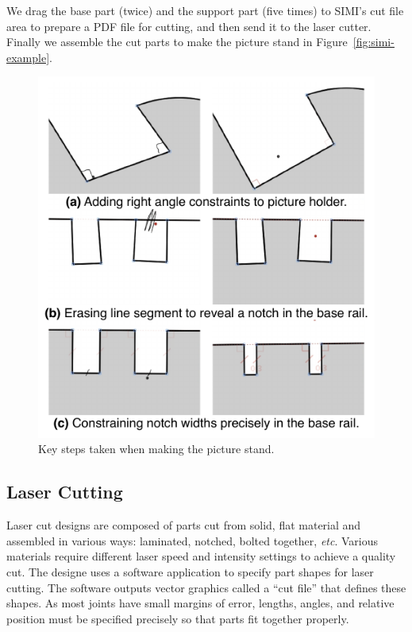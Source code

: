 \documentclass{article}
\begin{document}
We drag the base part (twice) and the support part (five times) to
SIMI’s cut file area to prepare a PDF file for cutting, and then send
it to the laser cutter.  Finally we assemble the cut parts to make the
picture stand in Figure~\ref{fig:simi-example}.


\begin{figure}[t]
  \centering
  \includegraphics{img/motivating-example.pdf}
  \caption{Key steps taken when making the picture stand.}
  \label{fig:motivating}
\end{figure}

\subsection{Laser Cutting}

Laser cut designs are composed of parts cut from solid, flat material
and assembled in various ways: laminated, notched, bolted together,
\textit{etc}. Various materials require different laser speed and
intensity settings to achieve a quality cut. The designe uses a
software application to specify part shapes for laser cutting. The
software outputs vector graphics called a ``cut file'' that defines
these shapes. As most joints have small margins of error, lengths,
angles, and relative position must be specified precisely so that
parts fit together properly.
\end{document}
